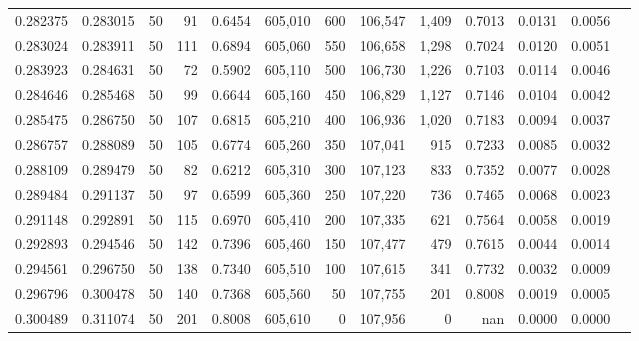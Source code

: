 \begin{tabular}{rrrrrrrrrrrrr}
0.282375 & 0.283015 &    50 &  91 &                                     0.6454 & 605,010 &     600 & 106,547 &   1,409 & 0.7013 & 0.0131 & 0.0056 \\
0.283024 & 0.283911 &    50 & 111 &                                     0.6894 & 605,060 &     550 & 106,658 &   1,298 & 0.7024 & 0.0120 & 0.0051 \\
0.283923 & 0.284631 &    50 &  72 &                                     0.5902 & 605,110 &     500 & 106,730 &   1,226 & 0.7103 & 0.0114 & 0.0046 \\
0.284646 & 0.285468 &    50 &  99 &                                     0.6644 & 605,160 &     450 & 106,829 &   1,127 & 0.7146 & 0.0104 & 0.0042 \\
0.285475 & 0.286750 &    50 & 107 &                                     0.6815 & 605,210 &     400 & 106,936 &   1,020 & 0.7183 & 0.0094 & 0.0037 \\
0.286757 & 0.288089 &    50 & 105 &                                     0.6774 & 605,260 &     350 & 107,041 &     915 & 0.7233 & 0.0085 & 0.0032 \\
0.288109 & 0.289479 &    50 &  82 &                                     0.6212 & 605,310 &     300 & 107,123 &     833 & 0.7352 & 0.0077 & 0.0028 \\
0.289484 & 0.291137 &    50 &  97 &                                     0.6599 & 605,360 &     250 & 107,220 &     736 & 0.7465 & 0.0068 & 0.0023 \\
0.291148 & 0.292891 &    50 & 115 &                                     0.6970 & 605,410 &     200 & 107,335 &     621 & 0.7564 & 0.0058 & 0.0019 \\
0.292893 & 0.294546 &    50 & 142 &                                     0.7396 & 605,460 &     150 & 107,477 &     479 & 0.7615 & 0.0044 & 0.0014 \\
0.294561 & 0.296750 &    50 & 138 &                                     0.7340 & 605,510 &     100 & 107,615 &     341 & 0.7732 & 0.0032 & 0.0009 \\
0.296796 & 0.300478 &    50 & 140 &                                     0.7368 & 605,560 &      50 & 107,755 &     201 & 0.8008 & 0.0019 & 0.0005 \\
0.300489 & 0.311074 &    50 & 201 &                                     0.8008 & 605,610 &       0 & 107,956 &       0 &    nan & 0.0000 & 0.0000 \\
\bottomrule
\end{tabular}
